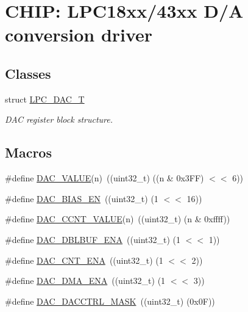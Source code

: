 \hypertarget{group___d_a_c__18_x_x__43_x_x}{}\section{C\+H\+IP\+: L\+P\+C18xx/43xx D/A conversion driver}
\label{group___d_a_c__18_x_x__43_x_x}
\subsection*{Classes}
\begin{DoxyCompactItemize}
\item 
struct \hyperlink{struct_l_p_c___d_a_c___t}{L\+P\+C\+\_\+\+D\+A\+C\+\_\+T}
\begin{DoxyCompactList}\small\item\em D\+AC register block structure. \end{DoxyCompactList}\end{DoxyCompactItemize}
\subsection*{Macros}
\begin{DoxyCompactItemize}
\item 
\#define \hyperlink{group___d_a_c__18_x_x__43_x_x_gac8d652cef1a35726a91ef3e5b4bad59c}{D\+A\+C\+\_\+\+V\+A\+L\+UE}(n)~((uint32\+\_\+t) ((n \& 0x3\+F\+F) $<$$<$ 6))
\item 
\#define \hyperlink{group___d_a_c__18_x_x__43_x_x_gabdfe0f0d61a206418a2ffdba26653873}{D\+A\+C\+\_\+\+B\+I\+A\+S\+\_\+\+EN}~((uint32\+\_\+t) (1 $<$$<$ 16))
\item 
\#define \hyperlink{group___d_a_c__18_x_x__43_x_x_ga23fecd9fa274c0f8387aad48330a0432}{D\+A\+C\+\_\+\+C\+C\+N\+T\+\_\+\+V\+A\+L\+UE}(n)~((uint32\+\_\+t) (n \& 0xffff))
\item 
\#define \hyperlink{group___d_a_c__18_x_x__43_x_x_gaa52ab08dc967f09afb7fcbb15ef1b1c0}{D\+A\+C\+\_\+\+D\+B\+L\+B\+U\+F\+\_\+\+E\+NA}~((uint32\+\_\+t) (1 $<$$<$ 1))
\item 
\#define \hyperlink{group___d_a_c__18_x_x__43_x_x_gae7c63d487a239e6abaf2bfdced3c67e4}{D\+A\+C\+\_\+\+C\+N\+T\+\_\+\+E\+NA}~((uint32\+\_\+t) (1 $<$$<$ 2))
\item 
\#define \hyperlink{group___d_a_c__18_x_x__43_x_x_gab00cf8cef7eee4ff812d53ae52e4b38d}{D\+A\+C\+\_\+\+D\+M\+A\+\_\+\+E\+NA}~((uint32\+\_\+t) (1 $<$$<$ 3))
\item 
\#define \hyperlink{group___d_a_c__18_x_x__43_x_x_ga3d9ce4bc003bffdea6fb98da402d2318}{D\+A\+C\+\_\+\+D\+A\+C\+C\+T\+R\+L\+\_\+\+M\+A\+SK}~((uint32\+\_\+t) (0x0\+F))
\end{DoxyCompactItemize}
